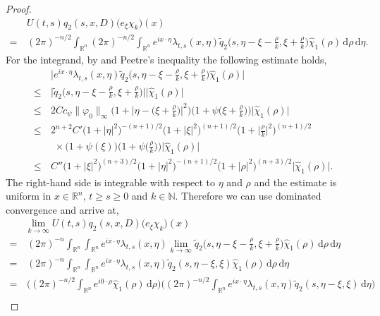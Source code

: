 \documentclass[a4paper, 12pt]{report}
\theoremstyle{cor}
\theoremstyle{remark}
\theoremstyle{definition}
\begin{document}
\begin{proof}
$$
\begin{aligned}
& \, U(t, s)q_2(s, x, D)\big(e_\xi\chi_k\big)(x)\\
= & \, (2\pi)^{-n/2}\int_{\mathbb{R}^n}(2\pi)^{-n/2}\int_{\mathbb{R}^n}e^{ix\cdot\eta}\lambda_{t, s}(x, \eta)\tilde{q}_2\Big(s, \eta - \xi - \frac{\rho}{k}, \xi + \frac{\rho}{k}\Big)\hat{\chi}_1(\rho)\,\mathrm{d}\rho\,\mathrm{d}\eta.
\end{aligned}
$$
For the integrand, by \cite[Lemma 6.2.B]{RZ} and Peetre's inequality the following estimate holds,
$$
\begin{aligned}
& \, \bigg|e^{ix\cdot\eta}\lambda_{t, s}(x, \eta)\tilde{q}_2\Big(s, \eta - \xi - \frac{\rho}{k}, \xi + \frac{\rho}{k}\Big)\hat{\chi}_1(\rho)\bigg|\\
\le & \, \bigg|\tilde{q}_2\Big(s, \eta - \xi - \frac{\rho}{k}, \xi + \frac{\rho}{k}\Big)\bigg|\big|\hat{\chi}_1(\rho)\big|\\
\le & \, 2Cc_\psi\|\varphi_0\|_\infty\bigg(1 + \Big|\eta - \Big(\xi + \frac{\rho}{k}\Big)\Big|^2\bigg)\bigg(1 + \psi\Big(\xi + \frac{\rho}{k}\Big)\bigg)\big|\hat{\chi}_1(\rho)\big|\\
\le & \, 2^{n + 2}C'\big(1 + |\eta|^2\big)^{-(n + 1)/2}\big(1 + |\xi|^2\big)^{(n + 1)/2}\bigg(1 + \Big|\frac{\rho}{k}\Big|^2\bigg)^{(n + 1)/2}\\
& \,\,\, \times \big(1 + \psi(\xi)\big)\bigg(1 + \psi\Big(\frac{\rho}{k}\Big)\bigg)\big|\hat{\chi}_1(\rho)\big|\\
\le & \, C''\big(1 + |\xi|^2\big)^{(n + 3)/2}\big(1 + |\eta|^2\big)^{-(n + 1)/2}\big(1 + |\rho|^2\big)^{(n + 3)/2}\big|\hat{\chi}_1(\rho)\big|.
\end{aligned}
$$
The right-hand side is integrable with respect to $\eta$ and $\rho$ and the estimate is uniform in $x \in \mathbb{R}^n$, $t \ge s \ge 0$ and $k \in \mathbb{N}$.  Therefore we can use dominated convergence and arrive at,
$$
\begin{aligned}
& \lim_{k \to \infty}U(t, s)q_2(s, x, D)\big(e_\xi\chi_k\big)(x)\\
= & \, (2\pi)^{-n}\int_{\mathbb{R}^n}\int_{\mathbb{R}^n}e^{ix\cdot\eta}\lambda_{t, s}(x, \eta)\lim_{k \to \infty}\tilde{q}_2\Big(s, \eta - \xi - \frac{\rho}{k}, \xi + \frac{\rho}{k}\Big)\hat{\chi}_1(\rho)\,\mathrm{d}\rho\,\mathrm{d}\eta\\
= & \, (2\pi)^{-n}\int_{\mathbb{R}^n}\int_{\mathbb{R}^n}e^{ix\cdot\eta}\lambda_{t, s}(x, \eta)\tilde{q}_2(s, \eta - \xi, \xi)\hat{\chi}_1(\rho)\,\mathrm{d}\rho\,\mathrm{d}\eta\\
= & \, \bigg((2\pi)^{-n/2}\int_{\mathbb{R}^n}e^{i0\cdot\rho}\hat{\chi}_1(\rho)\,\mathrm{d}\rho\bigg)\bigg((2\pi)^{-n/2}\int_{\mathbb{R}^n}e^{ix\cdot\eta}\lambda_{t, s}(x, \eta)\tilde{q}_2(s, \eta - \xi, \xi)\,\mathrm{d}\eta\bigg)\\

\end{aligned}$$
\end{proof}
\end{document}
